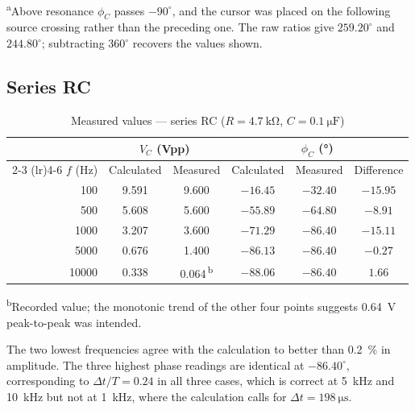 \documentclass[11pt]{article}
\begin{document}
\begin{table}[H]
    \vspace{0.4em}
    \footnotesize
    \raggedright
    \textsuperscript{a}Above resonance $\phi_C$ passes $-90^\circ$, and the cursor
    was placed on the following source crossing rather than the preceding one.
    The raw ratios give $259.20^\circ$ and $244.80^\circ$; subtracting
    $360^\circ$ recovers the values shown.
\end{table}

\subsection*{Series RC}

\begin{table}[H]
    \centering
    \caption{Measured values --- series RC ($R = \SI{4.7}{\kilo\ohm}$, $C = \SI{0.1}{\micro\farad}$)}
    \begin{tabular}{rccccc}
        \toprule
        & \multicolumn{2}{c}{$V_C$ (Vpp)} & \multicolumn{3}{c}{$\phi_C$ (\si{\degree})} \\
        \cmidrule(lr){2-3} \cmidrule(lr){4-6}
        $f$ (Hz) & Calculated & Measured & Calculated & Measured & Difference \\
        \midrule
        100   & 9.591 & 9.600 & $-16.45$ & $-32.40$ & $-15.95$ \\
        500   & 5.608 & 5.600 & $-55.89$ & $-64.80$ & $-8.91$  \\
        1000  & 3.207 & 3.600 & $-71.29$ & $-86.40$ & $-15.11$ \\
        5000  & 0.676 & 1.400 & $-86.13$ & $-86.40$ & $-0.27$  \\
        10000 & 0.338 & 0.064\,\textsuperscript{b} & $-88.06$ & $-86.40$ & $1.66$ \\
        \bottomrule
    \end{tabular}

    \vspace{0.4em}
    \footnotesize
    \raggedright
    \textsuperscript{b}Recorded value; the monotonic trend of the other four
    points suggests \SI{0.64}{\volt} peak-to-peak was intended.
\end{table}

The two lowest frequencies agree with the calculation to better than
\SI{0.2}{\percent} in amplitude. The three highest phase readings are identical
at $-86.40^\circ$, corresponding to $\Delta t / T = 0.24$ in all three cases,
which is correct at \SI{5}{\kilo\hertz} and \SI{10}{\kilo\hertz} but not at
\SI{1}{\kilo\hertz}, where the calculation calls for $\Delta t = \SI{198}{\micro\second}$.
\end{document}
